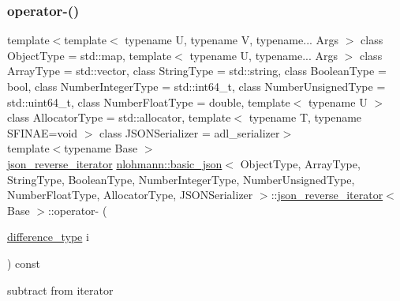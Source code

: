 \subsubsection{\texorpdfstring{operator-\/()}{operator-()}\hspace{0.1cm}{\footnotesize\ttfamily [1/2]}}
{\footnotesize\ttfamily template$<$template$<$ typename U, typename V, typename... Args $>$ class Object\+Type = std\+::map, template$<$ typename U, typename... Args $>$ class Array\+Type = std\+::vector, class String\+Type  = std\+::string, class Boolean\+Type  = bool, class Number\+Integer\+Type  = std\+::int64\+\_\+t, class Number\+Unsigned\+Type  = std\+::uint64\+\_\+t, class Number\+Float\+Type  = double, template$<$ typename U $>$ class Allocator\+Type = std\+::allocator, template$<$ typename T, typename S\+F\+I\+N\+A\+E=void $>$ class J\+S\+O\+N\+Serializer = adl\+\_\+serializer$>$ \\
template$<$typename Base $>$ \\
\mbox{\hyperlink{classnlohmann_1_1basic__json_1_1json__reverse__iterator}{json\+\_\+reverse\+\_\+iterator}} \mbox{\hyperlink{classnlohmann_1_1basic__json}{nlohmann\+::basic\+\_\+json}}$<$ Object\+Type, Array\+Type, String\+Type, Boolean\+Type, Number\+Integer\+Type, Number\+Unsigned\+Type, Number\+Float\+Type, Allocator\+Type, J\+S\+O\+N\+Serializer $>$\+::\mbox{\hyperlink{classnlohmann_1_1basic__json_1_1json__reverse__iterator}{json\+\_\+reverse\+\_\+iterator}}$<$ Base $>$\+::operator-\/ (\begin{DoxyParamCaption}\item[{\mbox{\hyperlink{classnlohmann_1_1basic__json_afe7c1303357e19cea9527af4e9a31d8f}{difference\+\_\+type}}}]{i }\end{DoxyParamCaption}) const\hspace{0.3cm}{\ttfamily [inline]}}



subtract from iterator 

\mbox{\label{classnlohmann_1_1basic__json_1_1json__reverse__iterator_a344164ae696f1c5e672d1e7d3ac20fd9}} 
